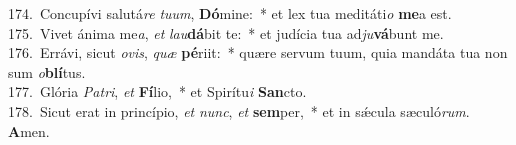 {174.~}Concupívi salutá\textit{re} \textit{tu}\textit{um}, \textbf{Dó}mine:~* et lex tua meditáti\textit{o} \textbf{me}a est.\\
{175.~}Vivet ánima me\textit{a}, \textit{et} \textit{lau}\textbf{dá}bit te:~* et judícia tua ad\textit{ju}\textbf{vá}bunt me.\\
{176.~}Errávi, sicut \textit{o}\textit{vis}, \textit{quæ} \textbf{pé}riit:~* quære servum tuum, quia mandáta tua non sum \textit{o}\textbf{blí}tus.\\
{177.~}Glória \textit{Pa}\textit{tri}, \textit{et} \textbf{Fí}lio,~* et Spirítu\textit{i} \textbf{San}cto.\\
{178.~}Sicut erat in princípio, \textit{et} \textit{nunc}, \textit{et} \textbf{sem}per,~* et in sǽcula sæculó\textit{rum}. \textbf{A}men.\\
